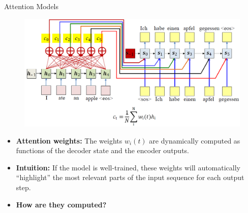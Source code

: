 \begin{frame}{Attention Models}
    \begin{figure}
        \centering
        \includegraphics[width=\linewidth, height=0.6\textheight,keepaspectratio]{images/nlp/attention-models.png}
    \end{figure}
    \begin{itemize}
        \setlength{\itemsep}{-0.5em}
        \item \textbf{Attention weights:} The weights $w_i(t)$ are dynamically computed as functions of the decoder state and the encoder outputs.
        \item<2-> \textbf{Intuition:} If the model is well-trained, these weights will automatically “highlight” the most relevant parts of the input sequence for each output step.
        \item<3-> \textbf{\large How are they computed?}
    \end{itemize}
\end{frame}

